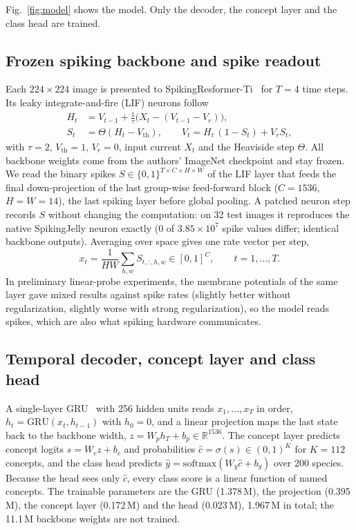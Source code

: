 \documentclass[conference]{IEEEtran}
\begin{document}
Fig.~\ref{fig:model} shows the model. Only the decoder, the concept layer and the class head are trained.

\subsection{Frozen spiking backbone and spike readout}
Each $224{\times}224$ image is presented to SpikingResformer-Ti~\cite{shi2024spikingresformer} for $T=4$ time steps. Its leaky integrate-and-fire (LIF) neurons follow
\begin{equation}
\begin{aligned}
H_t &= V_{t-1} + \tfrac{1}{\tau}\big(X_t - (V_{t-1}-V_r)\big),\\
S_t &= \Theta(H_t - V_{\mathrm{th}}),\qquad V_t = H_t\,(1-S_t) + V_r S_t ,
\end{aligned}
\label{eq:lif}
\end{equation}
with $\tau=2$, $V_{\mathrm{th}}=1$, $V_r=0$, input current $X_t$ and the Heaviside step $\Theta$. All backbone weights come from the authors' ImageNet checkpoint and stay frozen. We read the binary spikes $S\in\{0,1\}^{T\times C\times H\times W}$ of the LIF layer that feeds the final down-projection of the last group-wise feed-forward block ($C=1536$, $H=W=14$), the last spiking layer before global pooling. A patched neuron step records $S$ without changing the computation: on 32 test images it reproduces the native SpikingJelly neuron exactly (0 of $3.85\times10^{7}$ spike values differ; identical backbone outputs). Averaging over space gives one rate vector per step,
\begin{equation}
x_t=\frac{1}{HW}\sum_{h,w} S_{t,:,h,w}\in[0,1]^{C},\qquad t=1,\dots,T .
\label{eq:pool}
\end{equation}
In preliminary linear-probe experiments, the membrane potentials of the same layer gave mixed results against spike rates (slightly better without regularization, slightly worse with strong regularization), so the model reads spikes, which are also what spiking hardware communicates.

\subsection{Temporal decoder, concept layer and class head}
A single-layer GRU~\cite{cho2014learning} with 256 hidden units reads $x_1,\dots,x_T$ in order, $h_t=\mathrm{GRU}(x_t,h_{t-1})$ with $h_0=0$, and a linear projection maps the last state back to the backbone width, $z=W_p h_T+b_p\in\mathbb{R}^{1536}$. The concept layer predicts concept logits $s=W_c z+b_c$ and probabilities $\hat c=\sigma(s)\in(0,1)^K$ for $K=112$ concepts, and the class head predicts $\hat y=\mathrm{softmax}(W_y\hat c+b_y)$ over 200 species. Because the head sees only $\hat c$, every class score is a linear function of named concepts. The trainable parameters are the GRU (1.378\,M), the projection (0.395\,M), the concept layer (0.172\,M) and the head (0.023\,M), 1.967\,M in total; the 11.1\,M backbone weights are not trained.
\end{document}
